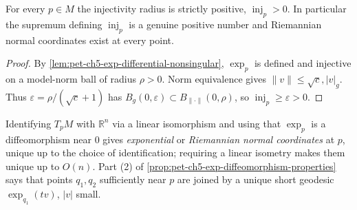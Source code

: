 \begin{lemma}
  \label{lem:pet-ch5-injectivity-radius-positive}


  For every $p\in M$ the injectivity radius is strictly positive,
  $\operatorname{inj}_p>0$. In particular the supremum defining $\operatorname{inj}_p$
  is a genuine positive number and Riemannian normal coordinates exist at every point.
\end{lemma}
\begin{proof}

  \sketch
  By \cref{lem:pet-ch5-exp-differential-nonsingular}, $\exp_p$ is defined and
  injective on a model-norm ball of radius $\rho>0$.  Norm equivalence gives
  $\|v\|\le\sqrt c,|v|_g$.  Thus
  $\varepsilon=\rho/(\sqrt c+1)$ has
  $B_g(0,\varepsilon)\subset B_{\|\cdot\|}(0,\rho)$, so
  $\operatorname{inj}_p\ge\varepsilon>0$.
\end{proof}

\begin{remark}
  \label{rem:pet-ch5-riemannian-normal-coordinates}


  Identifying $T_pM$ with $\mathbb R^n$ via a linear isomorphism and using that
  $\exp_p$ is a diffeomorphism near $0$ gives \emph{exponential} or \emph{Riemannian
  normal coordinates} at $p$, unique up to the choice of identification; requiring a
  linear isometry makes them unique up to $O(n)$. Part (2) of
  \cref{prop:pet-ch5-exp-diffeomorphism-properties} says that points $q_1,q_2$
  sufficiently near $p$ are joined by a unique short geodesic $\exp_{q_1}(tv)$,
  $|v|$ small.
\end{remark}

